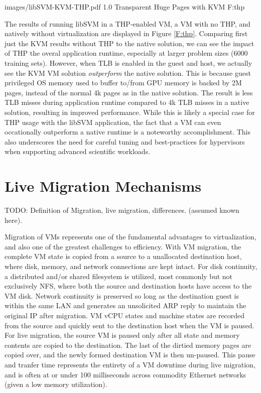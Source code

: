   {images/libSVM-KVM-THP.pdf}
  {1.0}
  {Transparent Huge Pages with KVM}
  {F:thp}


The results of running libSVM in a THP-enabled VM, a VM with no THP, and natively without virtualization are displayed in Figure \ref{F:thp}.  Comparing first just the KVM results without THP to the native solution, we can see the impact of THP the overal application runtime, especially at larger problem sizes (6000 training sets). However, when TLB is enabled in the guest and host, we actually see the KVM VM solution \emph{outperform} the native solution. This is because guest privileged OS memory used to buffer to/from GPU memory is backed by 2M pages, instead of the normal 4k pages as in the native solution. The result is less TLB misses during application runtime compared to 4k TLB misses in a native solution, resulting in improved performance.  While this is likely a special case for THP usage with the libSVM application, the fact that a VM can even occationally outperform a native runtime is a noteworthy accomplishment. This also underscores the need for careful tuning and best-practices for hypervisors when supporting advanced scientific workloads. 

\section{Live Migration Mechanisms}

TODO: Definition of Migration, live migration, differences. (assumed known here).

Migration of VMs represents one of the fundamental advantages to virtualization, and also one of the greatest challenges to efficiency.  With VM migration, the complete VM state is copied from a source to a unallocated destination host, where disk, memory, and network connections are kept intact. For disk continuity, a distributed and/or shared filesystem is utilized, most commonly but not exclusively NFS, where both the source and destination hosts have access to the VM disk.  Network continuity is preserved so long as the destination guest is within the same LAN and generates an unsolicited ARP reply to maintain the original IP after migration.  VM vCPU states and machine states are recorded from the source and quickly sent to the destination host when the VM is paused. For live migration, the source VM is paused only after all state and memory contents are copied to the destination. The last of the dirtied memory pages are copied over, and the newly formed destination VM is then un-paused.  This pause and tranfer time represents the entirety of a VM downtime during live migration, and is often at or under 100 milliseconds across commodity Ethernet networks (given a low memory utilization).  

